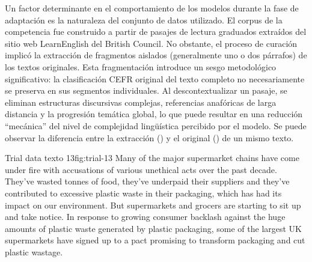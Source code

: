 Un factor determinante en el comportamiento de los modelos durante la fase de adaptación es la naturaleza del conjunto de datos utilizado. El corpus de la competencia fue construido a partir de pasajes de lectura graduados extraídos del sitio web LearnEnglish del British Council. No obstante, el proceso de curación implicó la extracción de fragmentos aislados (generalmente uno o dos párrafos) de los textos originales. Esta fragmentación introduce un sesgo metodológico significativo: la clasificación CEFR original del texto completo no necesariamente se preserva en sus segmentos individuales. Al descontextualizar un pasaje, se eliminan estructuras discursivas complejas, referencias anafóricas de larga distancia y la progresión temática global, lo que puede resultar en una reducción ``mecánica'' del nivel de complejidad lingüística percibido por el modelo. Se puede observar la diferencia entre la extracción () y el original () de un mismo texto.

\begin{textexample}{}{Trial data texto 13}{fig:trial-13}
Many of the major supermarket chains have come under fire with accusations of various unethical acts over the past decade. They've wasted tonnes of food, they've underpaid their suppliers and they've contributed to excessive plastic waste in their packaging, which has had its impact on our environment. But supermarkets and grocers are starting to sit up and take notice. In response to growing consumer backlash against the huge amounts of plastic waste generated by plastic packaging, some of the largest UK supermarkets have signed up to a pact promising to transform packaging and cut plastic wastage.
\end{textexample}

